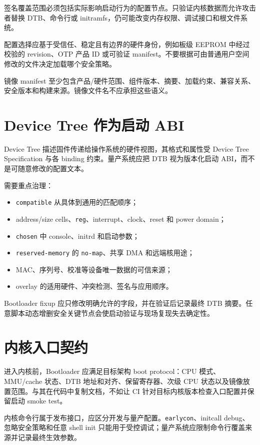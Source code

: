 签名覆盖范围必须包括实际影响启动行为的配置节点。只验证内核数据而允许攻击者替换 DTB、命令行或 initramfs，仍可能改变内存权限、调试接口和根文件系统。

配置选择应基于受信任、稳定且有边界的硬件身份，例如板级 EEPROM 中经过校验的 revision、OTP 产品 ID 或可验证 manifest。不要根据可由普通用户空间修改的文件决定加载哪个安全策略。

镜像 manifest 至少包含产品/硬件范围、组件版本、摘要、加载约束、兼容关系、安全版本和构建来源。镜像文件名不应承担这些语义。

\section{Device Tree 作为启动 ABI}

Device Tree 描述固件传递给操作系统的硬件视图，其格式和属性受 Device Tree Specification 与各 binding 约束\cite{devicetree-spec}。量产系统应把 DTB 视为版本化启动 ABI，而不是可随意修改的配置文本。

需要重点治理：

\begin{itemize}
  \item \texttt{compatible} 从具体到通用的匹配顺序；
  \item address/size cells、\texttt{reg}、interrupt、clock、reset 和 power domain；
  \item \texttt{chosen} 中 console、initrd 和启动参数；
  \item \texttt{reserved-memory} 的 \texttt{no-map}、共享 DMA 和远端核用途；
  \item MAC、序列号、校准等设备唯一数据的可信来源；
  \item overlay 的适用硬件、冲突检测、签名与应用顺序。
\end{itemize}

Bootloader fixup 应只修改明确允许的字段，并在验证后记录最终 DTB 摘要。任意脚本动态增删安全关键节点会使启动验证与现场复现失去确定性。

\section{内核入口契约}

进入内核前，Bootloader 应满足目标架构 boot protocol：CPU 模式、MMU/cache 状态、DTB 地址和对齐、保留寄存器、次级 CPU 状态以及镜像放置范围。与其在代码中复制文档，不如让 CI 针对目标内核版本检查入口配置并保留启动 smoke test。

内核命令行属于发布接口，应区分开发与量产配置。\texttt{earlycon}、initcall debug、忽略安全策略和任意 shell init 只能用于受控调试；量产系统应限制命令行覆盖来源并记录最终生效参数。


